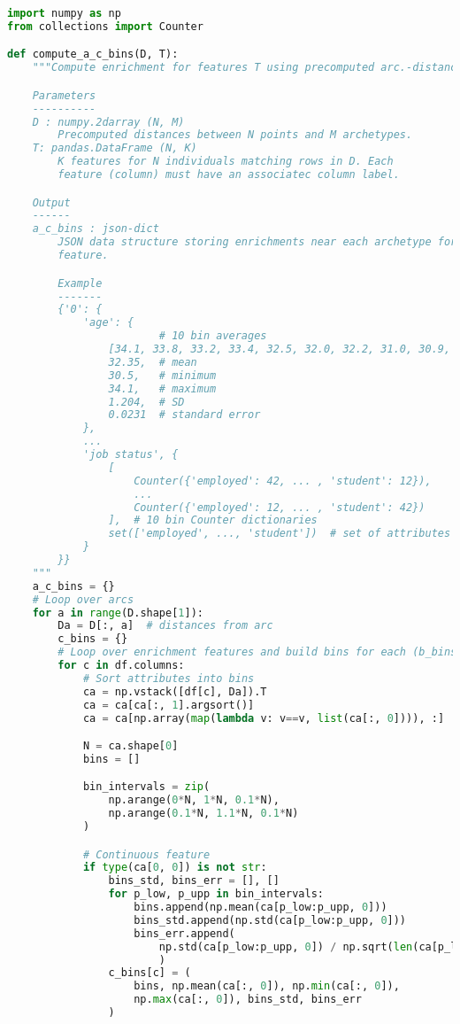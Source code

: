 \begin{lstlisting}[language=Python, label={lst:enrichments}, caption="Python code for computing enrichments near archetypes"]
import numpy as np
from collections import Counter

def compute_a_c_bins(D, T):
    """Compute enrichment for features T using precomputed arc.-distances, D.

    Parameters
    ----------
    D : numpy.2darray (N, M)
        Precomputed distances between N points and M archetypes.
    T: pandas.DataFrame (N, K)
        K features for N individuals matching rows in D. Each
        feature (column) must have an associatec column label.

    Output
    ------
    a_c_bins : json-dict
        JSON data structure storing enrichments near each archetype for each
        feature.

        Example
        -------
        {'0': {
            'age': {
                        # 10 bin averages
                [34.1, 33.8, 33.2, 33.4, 32.5, 32.0, 32.2, 31.0, 30.9, 30.5],
                32.35,  # mean
                30.5,   # minimum
                34.1,   # maximum
                1.204,  # SD
                0.0231  # standard error
            }, 
            ...
            'job status', {
                [   
                    Counter({'employed': 42, ... , 'student': 12}),
                    ...
                    Counter({'employed': 12, ... , 'student': 42})
                ],  # 10 bin Counter dictionaries                               
                set(['employed', ..., 'student'])  # set of attributes
            }
        }}
    """
    a_c_bins = {}
    # Loop over arcs
    for a in range(D.shape[1]):
        Da = D[:, a]  # distances from arc
        c_bins = {}
        # Loop over enrichment features and build bins for each (b_bins)
        for c in df.columns:
            # Sort attributes into bins
            ca = np.vstack([df[c], Da]).T
            ca = ca[ca[:, 1].argsort()]
            ca = ca[np.array(map(lambda v: v==v, list(ca[:, 0]))), :]

            N = ca.shape[0]
            bins = []

            bin_intervals = zip(
                np.arange(0*N, 1*N, 0.1*N),
                np.arange(0.1*N, 1.1*N, 0.1*N)
            )

            # Continuous feature
            if type(ca[0, 0]) is not str:
                bins_std, bins_err = [], []
                for p_low, p_upp in bin_intervals:
                    bins.append(np.mean(ca[p_low:p_upp, 0]))
                    bins_std.append(np.std(ca[p_low:p_upp, 0]))
                    bins_err.append(
                        np.std(ca[p_low:p_upp, 0]) / np.sqrt(len(ca[p_low:p_upp, 0]))
                        )
                c_bins[c] = (
                    bins, np.mean(ca[:, 0]), np.min(ca[:, 0]),
                    np.max(ca[:, 0]), bins_std, bins_err
                )
            

\end{lstlisting}
